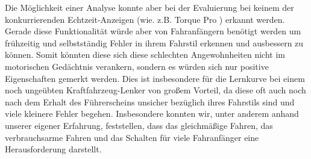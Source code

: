 Die Möglichkeit einer Analyse konnte aber bei der Evaluierung bei keinem der konkurrierenden Echtzeit-Anzeigen (wie. z.B. Torque Pro \cite{Torque.Pro}) erkannt werden. Gerade diese Funktionalität würde aber von Fahranfängern benötigt werden um frühzeitig und selbstständig Fehler in ihrem Fahrstil erkennen und ausbessern zu können. Somit könnten diese sich diese schlechten Angewohnheiten nicht im motorischen Gedächtnis verankern, sondern es würden sich nur positive Eigenschaften gemerkt werden. Dies ist insbesondere für die Lernkurve bei einem noch ungeübten Kraftfahrzeug-Lenker von großem Vorteil, da diese oft auch noch nach dem Erhalt des Führerscheins unsicher bezüglich ihres Fahrstils sind und viele kleinere Fehler begehen. Insbesondere konnten wir, unter anderem anhand unserer eigener Erfahrung, feststellen, dass das gleichmäßige Fahren, das verbrauchsarme Fahren und das Schalten für viele Fahranfänger eine Herausforderung darstellt.
